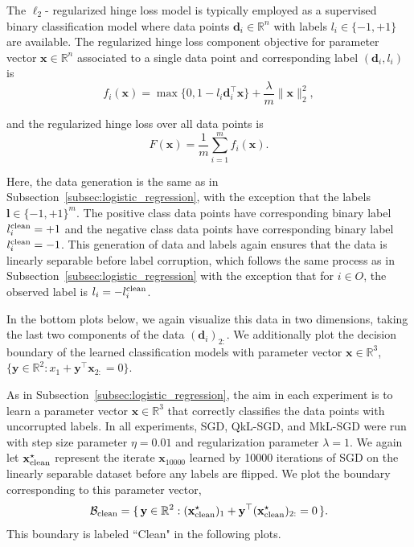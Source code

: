 \documentclass[11pt]{article}
\newcommand{\ve}[1]{\mathbf{#1}}
\begin{document}
The $\ell_2$- regularized hinge loss model is typically employed as a supervised binary classification model where data points $\ve{d}_i \in \mathbb{R}^n$ with labels $l_i \in \{-1, +1\}$ are available.  The regularized hinge loss component objective for parameter vector $\ve{x} \in \mathbb{R}^n$ associated to a single data point and corresponding label $(\ve{d}_i, l_i)$ is
\begin{equation}
f_i(\ve{x}) = \max\{0, 1 - l_i \ve{d}_i^\top \ve{x}\} + \frac{\lambda}{m}\|\ve{x}\|_2^2, \label{eq:hingeloss_component}
\end{equation}

and the regularized hinge loss over all data points is
\begin{equation}
F(\ve{x}) = \frac1m \sum_{i=1}^m f_i(\ve{x}). \label{eq:hinge_loss}
\end{equation}


Here, the data generation is the same as in Subsection~\ref{subsec:logistic_regression}, with the exception that the labels $\ve{l} \in \{-1, +1\}^m$.  The positive class data points have corresponding binary label $l_i^{\rm clean} = +1$ and the negative class data points have corresponding binary label $l_i^{\rm clean} = -1$. This generation of data and labels again ensures that the data is linearly separable before label corruption, which follows the same process as in Subsection~\ref{subsec:logistic_regression} with the exception that for $i \in O$, the observed label is $l_i = -l_i^{\rm clean}$.

In the bottom plots below, we again visualize this data in two dimensions, taking the last two components of the data $(\ve{d}_i)_{2:}$.  We additionally plot the decision boundary of the learned classification models with parameter vector $\ve{x} \in \mathbb{R}^3$, $\{\ve{y} \in \mathbb{R}^2 : x_1 + \ve{y}^\top \ve{x}_{2:} = 0\}$.


As in Subsection~\ref{subsec:logistic_regression}, the aim in each experiment is to learn a parameter vector $\ve{x} \in \mathbb{R}^3$ that correctly classifies the data points with uncorrupted labels.  In all experiments, SGD, QkL-SGD, and MkL-SGD were run with step size parameter $\eta = 0.01$ and regularization parameter $\lambda = 1$.  We again let $\ve{x}^\star_{\rm clean}$ represent the iterate $\ve{x}_{10000}$ learned by 10000 iterations of SGD on the linearly separable dataset before any labels are flipped.  We plot the boundary corresponding to this parameter vector, $$\mathcal B_{\rm clean}
=
\{\,\ve y\in \mathbb R^2 :
(\ve{x}^\star_{\rm clean})_1
+
\ve y^\top(\ve{x}^\star_{\rm clean})_{2:}=0
\,\}.$$  This boundary is labeled ``Clean" in the following plots.
\end{document}
